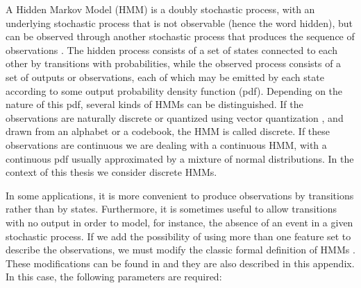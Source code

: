 \documentclass{article}[14pt, oneside, a4paper, times]
\begin{document}
A Hidden Markov Model (HMM) is a doubly stochastic process, with an underlying
stochastic process that is not observable (hence the word hidden), but can be
observed through another stochastic process that produces the sequence of
observations \cite{Rabiner89}. The hidden process consists of a set of states
connected to each other by transitions with probabilities, while the observed
process consists of a set of outputs or observations, each of which may be
emitted by each state according to some output probability density function
(pdf). Depending on the nature of this pdf, several kinds of HMMs can be
distinguished. If the observations are naturally discrete or quantized using
vector quantization \cite{Huang90}, and drawn from an alphabet or a codebook,
the HMM is called discrete. If these observations are continuous we are dealing
with a continuous HMM, with a continuous pdf usually approximated by a mixture
of normal distributions. In the context of this thesis we consider discrete
HMMs.

In some applications, it is more convenient to produce observations by
transitions rather than by states. Furthermore, it is sometimes useful to allow
transitions with no output in order to model, for instance, the absence of an
event in a given stochastic process. If we add the possibility of using more
than one feature set to describe the observations, we must modify the classic
formal definition of HMMs \cite{Rabiner89}. These modifications can be found in
\cite{ElYacoubi99-1} and they are also described in this appendix. In this
case, the following parameters are required:
\end{document}
